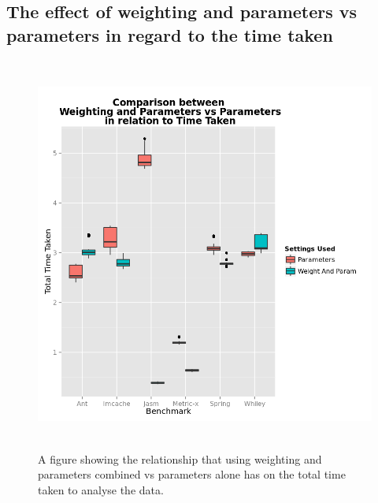 \documentclass[11pt
              , a4paper
              , twoside
              , openright
              ]{report}
\begin{document}
\begin{appendices}
\chapter{The effect of weighting and parameters vs parameters in regard to the time taken}
\begin{figure}[h]
\centering
\includegraphics[width=\textwidth,height=13cm]{WeightnParamvParamTime.png}
\caption{A figure showing the relationship that using weighting and parameters combined vs parameters alone has on the total time taken to analyse the data.}
\label{fig:weightparamvparamtime}
\end{figure}




\end{appendices} \newpage 


\backmatter



%


\end{document}
